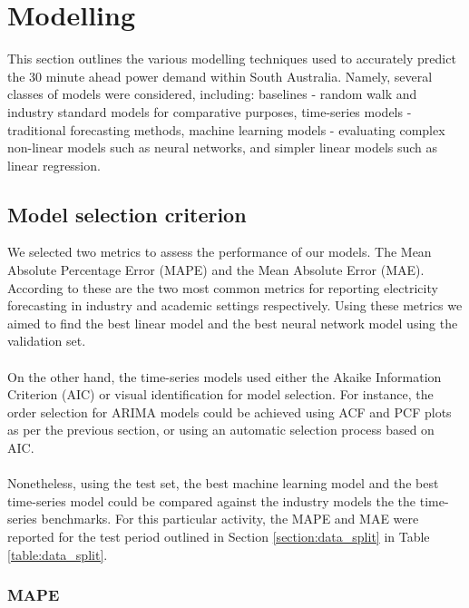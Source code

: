 \documentclass[11pt]{article}
\begin{document}

\section{Modelling}
\label{section:modelling}

This section outlines the various modelling techniques used to accurately predict the 30 minute ahead power demand within South Australia. Namely, several classes of models were considered, including: baselines - random walk and industry standard models for comparative purposes, time-series models - traditional forecasting methods, machine learning models - evaluating complex non-linear models such as neural networks, and simpler linear models such as linear regression.

\subsection{Model selection criterion}
\label{section:model_selection_criterion}

We selected two metrics to assess the performance of our models.
The Mean Absolute Percentage Error (MAPE) and the Mean Absolute Error (MAE). According to \citet{kotillova_statistical_2012} these are the two most common metrics for reporting electricity forecasting in industry and academic settings respectively. Using these metrics we aimed to find the best linear model and the best neural network model using the validation set.
\\
\\
On the other hand, the time-series models used either the Akaike Information Criterion (AIC) or visual identification for model selection. For instance, the order selection for ARIMA models could be achieved using ACF and PCF plots as per the previous section, or using an automatic selection process based on AIC. 
\\
\\
Nonetheless, using the test set, the best machine learning model and the best time-series model could be compared against the industry models the the time-series benchmarks. For this particular activity, the MAPE and MAE were reported for the test period outlined in Section \ref{section:data_split} in Table \ref{table:data_split}.

\subsubsection{MAPE}
\end{document}
